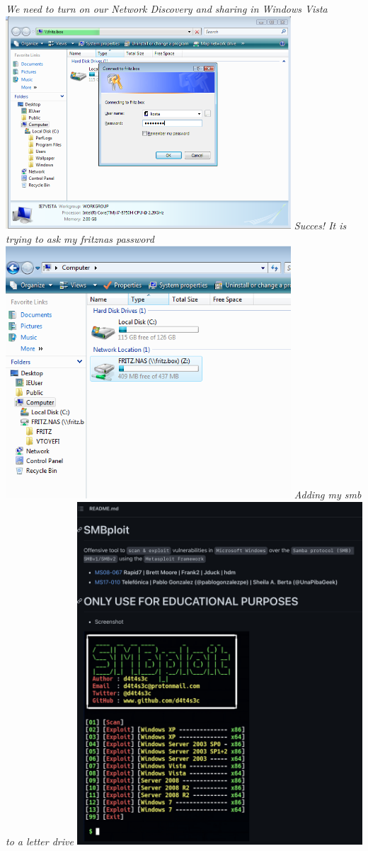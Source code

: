 \documentclass[12pt, letterpaper]{article}
\begin{document}
\break
\emph{We need to turn on our Network Discovery and sharing in Windows Vista}
\hfill\break
\hfill\break
\includegraphics[width=0.8\textwidth]{fotos/PVI/Windows Vista/login smb fritz.png}
\break
\emph{Succes! It is trying to ask my fritznas password}
\hfill\break
\hfill\break
\includegraphics[width=0.8\textwidth]{fotos/PVI/Windows Vista/mapped fritznas.png}
\break
\emph{Adding my smb to a letter drive}
\hfill\break
\hfill\break
\includegraphics[width=0.8\textwidth]{fotos/PVI/Windows Vista/Github smbploit.jpeg}
\end{document}
